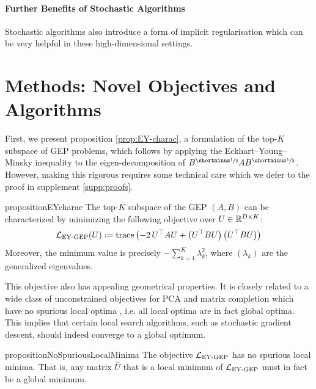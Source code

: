 \paragraph{Further Benefits of Stochastic Algorithms}
Stochastic algorithms also introduce a form of implicit regularisation \citep{smith2021origin} which can be very helpful in these high-dimensional settings.


\section{Methods: Novel Objectives and Algorithms}\label{sec:contributions}

First, we present proposition \ref{prop:EY-charac}, a formulation of the top-$K$ subspace of GEP problems, which follows by applying the Eckhart--Young--Minsky inequality \citep{stewart_matrix_1990} to the eigen-decomposition of $B^\mhalf A B^\mhalf$. However, making this rigorous requires some technical care which we defer to the proof in supplement \ref{supp:proofs}.

\begin{restatable}{proposition}{EYcharac}
\label{prop:EY-charac}
    The top-$K$ subspace of the GEP $(A,B)$ can be characterized by minimizing the following objective over $U \in \mathbb{R}^{D \times K}$:
    \begin{align}\label{eq:EY-charac}
        \mathcal{L}_\text{EY-GEP}(U) \vcentcolon= \operatorname{trace} \left( - 2\,U^\top A U + \left(U^\top B U\right) \left(U^\top B U\right) \right)
    \end{align}
    Moreover, the minimum value is precisely $- \sum_{k=1}^K \lambda_k^2$, where $(\lambda_k)$ are the generalized eigenvalues.
\end{restatable}

This objective also has appealing geometrical properties. 
It is closely related to a wide class of unconstrained objectives for PCA and matrix completion which have no spurious local optima \citep{ge_no_2017}, i.e. all local optima are in fact global optima. 
This implies that certain local search algorithms, such as stochastic gradient descent, should indeed converge to a global optimum.

\begin{restatable}{proposition}{NoSpuriousLocalMinima}\label{prop:no-spurious}
    The objective $\mathcal{L}_\text{EY-GEP}$ has no spurious local minima.
    That is, any matrix $\bar{U}$ that is a local minimum of $\mathcal{L}_\text{EY-GEP}$ must in fact be a global minimum.
\end{restatable}

